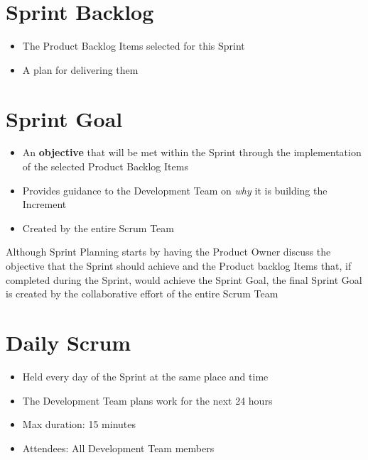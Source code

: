 \documentclass[a4paper,11pt,twocolumn]{article}
\begin{document}
\section*{Sprint Backlog}
\begin{itemize}
    \item The Product Backlog Items selected for this Sprint
    \item A plan for delivering them
\end{itemize}

\section*{Sprint Goal}
\begin{itemize}
    \item An \textbf{objective} that will be met within the Sprint through the implementation of the selected Product Backlog Items
    \item Provides guidance to the Development Team on \textit{why} it is building the Increment
    \item Created by the entire Scrum Team
\end{itemize}

\begin{tcolorbox}[colback=black!8!white,colframe=gray!50!black,title=Note,sharp corners,fonttitle=\normalsize\bfseries,fontupper=\normalsize,left=0.7em,right=0.7em]
	Although Sprint Planning starts by having the Product Owner discuss the objective that the Sprint should achieve and the Product backlog Items that, if completed during the Sprint, would achieve the Sprint Goal, the final Sprint Goal is created by the collaborative effort of the entire Scrum Team
\end{tcolorbox}

\section*{Daily Scrum}
\begin{itemize}
    \item Held every day of the Sprint at the same place and time
    \item The Development Team plans work for the next 24 hours
	\item Max duration: 15 minutes
	\item Attendees: All Development Team members
\end{itemize}
\end{document}

